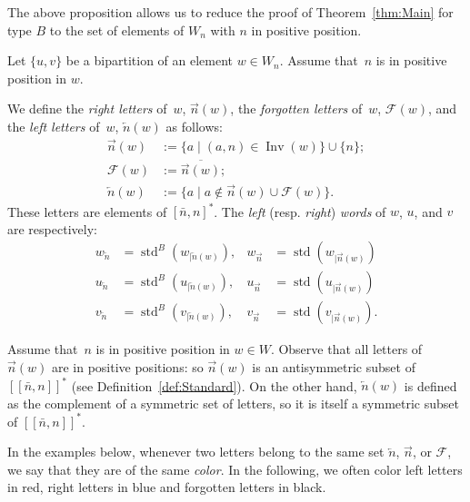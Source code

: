 \documentclass[ALCO,Unicode]{cedram}
\theoremstyle{definition}
\DeclareMathOperator{\std}{std}
\newcommand{\rest}[2]{#1_{|#2}}
\newcommand{\srest}[2]{\std(#1_{|#2})}
\DeclareMathOperator{\invs}{Inv}
\newcommand{\R}{{\overrightarrow{n}}}
\newcommand{\LL}{{\overleftarrow{n}}}
\newcommand{\Bsetnn}{[\![\bar{n},n ]\!]^*}
\newcommand{\Bstd}{\std^{B}}
\newcommand{\Bsrest}[2]{\Bstd(\rest{#1}{#2})}
\newcommand{\F}{\mathcal{F}}
\begin{document}
The above proposition allows us to reduce the proof of Theorem~\ref{thm:Main}  for type $B$ to the set of elements of $W_n$ with $n$ in positive position. 

\begin{defi}
\label{def:Bdecomp}
Let $\lbrace u, v \rbrace$ be a bipartition of an element $w \in W_n$. Assume that~$n$ is in positive position in $w$. 

We define the \emph{right letters} of~$w$, $\R(w)$, the \emph{forgotten letters} of~$w$, $\F(w)$, and the \emph{left letters} of~$w$, $\LL(w)$  as follows:
\begin{align*}
\R(w) &:= \lbrace a\mid (a,n) \in \invs(w) \rbrace \cup \lbrace n \rbrace; \\
\F(w) &:= \overline{\R(w)}; \\
\LL(w) &:= \lbrace a \mid a \not\in \R(w) \cup \F(w) \rbrace.
\end{align*}
These letters are elements of $[\bar n,n]^*$. The {\em left} (resp. {\em right}) {\em words} of $w$, $u$, and $v$ are respectively:
\begin{align*}
w_\LL &= \Bsrest{w}{\LL(w)}, & w_\R &= \srest{w}{\R(w)} \\
u_\LL &= \Bsrest{u}{\LL(w)}, & u_\R &= \srest{u}{\R(w)} \\
v_\LL &= \Bsrest{v}{\LL(w)}, & v_\R &= \srest{v}{\R(w)}. 
\end{align*}
\end{defi}

\begin{remark}  Assume that~$n$ is in positive position in $w\in W$. Observe that   all letters of $\R(w)$ are in positive positions: so $\R(w)$ is an antisymmetric subset of $\Bsetnn$ (see Definition~\ref{def:Standard}). On the other hand, $\LL(w)$ is defined as the complement of a symmetric set of letters, so it is itself a symmetric subset of $\Bsetnn$. 
\end{remark}

In the examples below,  whenever two letters belong to the same set $\LL$, $\R$, or $\F$, we say that they are of the same \emph{color}. In the following, we often color left letters in red, right letters in blue and forgotten letters in black.
\end{document}
